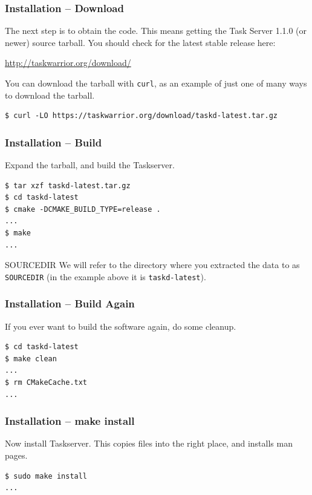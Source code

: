 \documentclass[t,handout]{beamer}
\begin{document}
\begin{frame}[fragile]\frametitle{Installation -- Download}\label{download}
    \vfill
    The next step is to obtain the code. This means getting the Task Server 1.1.0 (or newer) source tarball.  You should check for the latest stable release here:

    \href{http://taskwarrior.org/download/}{http://taskwarrior.org/download/}

    \vfill
    You can download the tarball with \verb+curl+, as an example of just one of many ways to download the tarball.

    \begin{lstlisting}
$ curl -LO https://taskwarrior.org/download/taskd-latest.tar.gz\end{lstlisting}
\end{frame}

\begin{frame}[fragile]\frametitle{Installation -- Build}\label{buildtar}
    \vfill
    Expand the tarball, and build the Taskserver.

    \begin{lstlisting}
$ tar xzf taskd-latest.tar.gz
$ cd taskd-latest
$ cmake -DCMAKE_BUILD_TYPE=release .
...
$ make
...\end{lstlisting}

    \begin{alertblock}{SOURCEDIR}
        We will refer to the directory where you extracted the data to as \verb=SOURCEDIR= (in the example above it is \verb=taskd-latest=).
    \end{alertblock}
\end{frame}

\begin{frame}[fragile]\frametitle{Installation -- Build Again}\label{buildagain}
    \vfill
    If you ever want to build the software again, do some cleanup.

    \begin{lstlisting}
$ cd taskd-latest
$ make clean
...
$ rm CMakeCache.txt
...\end{lstlisting}
\end{frame}

\begin{frame}[fragile]\frametitle{Installation -- make install}
    \vfill
    Now install Taskserver.  This copies files into the right place, and installs man pages.

    \begin{lstlisting}
$ sudo make install
...\end{lstlisting}
\end{frame}
\end{document}
